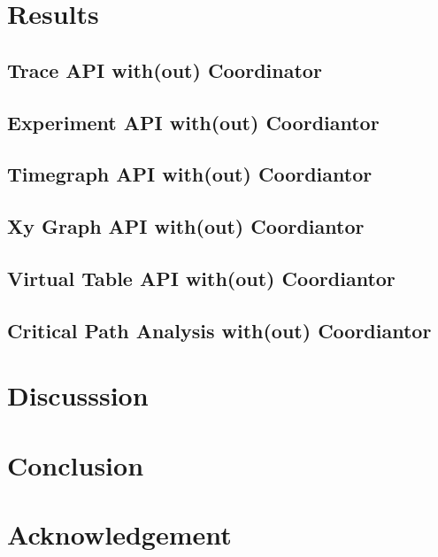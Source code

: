 \section{Results}

\subsection{Trace API with(out) Coordinator}

\subsection{Experiment API with(out) Coordiantor}

\subsection{Timegraph API with(out) Coordiantor}

\subsection{Xy Graph API with(out) Coordiantor}

\subsection{Virtual Table API with(out) Coordiantor}

\subsection{Critical Path Analysis with(out) Coordiantor}

\section{Discusssion}

\section{Conclusion}

\section{Acknowledgement}